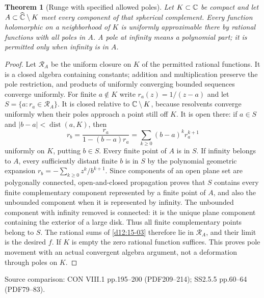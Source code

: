 \documentclass[11pt,a4paper,openany]{book}
\newtheorem{theorem}{Theorem}[chapter]
\theoremstyle{definition}
\theoremstyle{remark}\newtheorem{remark}[theorem]{Remark}
\DeclareMathOperator{\dist}{dist}\DeclareMathOperator{\ord}{ord}
\newcommand{\family}[1]{}
\newcommand{\source}[1]{\par\begingroup\small\sffamily\color{black!65}Source comparison: #1\par\endgroup}
\begin{document}
\begin{theorem}[Runge with specified allowed poles]\family{D12.15.04}\label{d12:15-04}
Let $K\subset\mathbb C$ be compact and let $A\subset\widehat{\mathbb C}\setminus K$ meet every component of that spherical complement. Every function holomorphic on a neighborhood of $K$ is uniformly approximable there by rational functions with all poles in $A$. A pole at infinity means a polynomial part; it is permitted only when infinity is in $A$.
\end{theorem}
\begin{proof}
Let $\mathcal R_A$ be the uniform closure on $K$ of the permitted rational functions. It is a closed algebra containing constants; addition and multiplication preserve the pole restriction, and products of uniformly converging bounded sequences converge uniformly. For finite $a\notin K$ write $r_a(z)=1/(z-a)$ and let $S=\{a:r_a\in\mathcal R_A\}$. It is closed relative to $\mathbb C\setminus K$, because resolvents converge uniformly when their poles approach a point still off $K$. It is open there: if $a\in S$ and $|b-a|<\dist(a,K)$, then
\[
 r_b=\frac{r_a}{1-(b-a)r_a}
 =\sum_{k\ge0}(b-a)^k r_a^{k+1}
\]
uniformly on $K$, putting $b\in S$. Every finite point of $A$ is in $S$. If infinity belongs to $A$, every sufficiently distant finite $b$ is in $S$ by the polynomial geometric expansion $r_b=-\sum_{k\ge0}z^k/b^{k+1}$. Since components of an open plane set are polygonally connected, open-and-closed propagation proves that $S$ contains every finite complementary component represented by a finite point of $A$, and also the unbounded component when it is represented by infinity. The unbounded component with infinity removed is connected: it is the unique plane component containing the exterior of a large disk. Thus all finite complementary points belong to $S$. The rational sums of \cref{d12:15-03} therefore lie in $\mathcal R_A$, and their limit is the desired $f$. If $K$ is empty the zero rational function suffices. This proves pole movement with an actual convergent algebra argument, not a deformation through poles on $K$.
\end{proof}
\source{CON VIII.1 pp.195--200 (PDF209--214); SS2.5.5 pp.60--64 (PDF79--83).}
\end{document}
